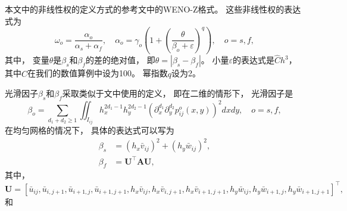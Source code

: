 本文中的非线性权的定义方式的参考文\cite{WENO_Z}中的WENO-Z格式。
这些非线性权的表达式为
\begin{equation}
  \label{eq:nonlinearweight}
  \omega_{{o}}=\frac{\alpha_{{o}}}{\alpha_{{s}}+\alpha_{{f}}}, \quad
  \alpha_{{o}}=\gamma_{{o}}\left( 1+\left( \frac{\theta}{\beta_{{o}}+\varepsilon}\right)^q \right) , \quad {{o}}={{s}}, {{f}},
\end{equation}
其中，
变量$\theta$是$\beta_{{s}}$和$\beta_{{f}}$的差的绝对值，
即$\theta = |\beta_{{s}}-\beta_{{f}}|$。
小量$\varepsilon$的表达式是$\widehat{C}h^3$，
其中$\widehat{C}$在我们的数值算例中设为100。
幂指数$q$设为2。

光滑因子$\beta_{{s}}$和$\beta_{{f}}$采取类似于文\cite{WENO-1996}中使用的定义，
即在二维的情形下，
光滑因子是
\begin{equation}
  \beta_{{o}}= \sum_{d_1+d_2\ge1}\iint_{I_{ij}}h_x^{2d_1-1}h_y^{2d_2-1}\left({\partial_{x}^{d_1}}{\partial_{y}^{d_2}}p_{ij}^{{o}}(x,y)\right)^2 dxdy, \quad {{o}}={{s}},{{f}},
\end{equation}
在均匀网格的情况下，
具体的表达式可以写为
\begin{align}
  \beta_{{s}} & = (h_x \bar v_{ij})^2+ (h_y \bar w_{ij})^2, \\
  \beta_{{f}} & = \bm U^\top\bm A \bm U,
\end{align}
其中，
\begin{equation}
  \bm U = \left[\bar u_{ij},\bar u_{i,j+1},\bar u_{i+1,j},\bar u_{i+1,j+1},h_x \bar v_{ij},h_x \bar v_{i,j+1},h_x \bar v_{i+1,j+1},h_y \bar w_{ij},h_y \bar w_{i+1,j},h_y \bar w_{i+1,j+1}\right]^\top,
\end{equation}
和
